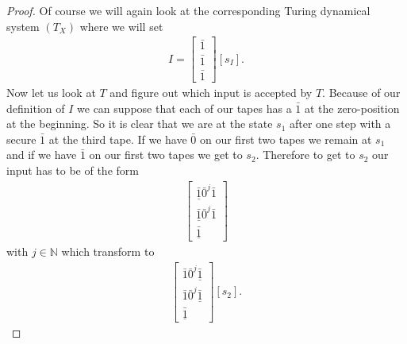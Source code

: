 \documentclass[12pt,a4paper]{scrartcl}
\theoremstyle{plain}
\theoremstyle{definition}
\numberwithin{equation}{section}
\newcommand{\N}{\mathbb{N}} %
\newcommand{\2}{\mathbb{Z} / 2 \mathbb{Z}}
\newcommand{\1}{\bar{1}}
\newcommand{\0}{\bar{0}}
\begin{document}
\begin{proof}
	
	Of course we will again look at the corresponding Turing dynamical system $(T_X)$ where we will set 
	\begin{align*}
		I = \begin{bmatrix}
		\1 \\
		\1 \\
		\1 
		\end{bmatrix}[s_I].
	\end{align*}
	Now let us look at $T$ and figure out which input is accepted by $T$. Because of our definition of $I$ we can suppose that each of our tapes has a $\1$ at the zero-position at the beginning. So it is clear that we are at the state $s_1$ after one step with a secure $\1$ at the third tape. If we have $\0$ on our first two tapes we remain at $s_1$ and if we have $\1$ on our first two tapes we get to $s_2$. Therefore to get to $s_2$ our input has to be of the form 
	\begin{align*}
		\begin{bmatrix}
			\underline{\1} \0^j \1 \\
			\underline{\1} \0^j \1 \\
			\underline{\1} 
		\end{bmatrix}
	\end{align*}
	with $j \in \N$ which transform to
	\begin{align*}
	\begin{bmatrix}
	\1 \0^j \underline{\1}  \\
	\1 \0^j \underline{\1}  \\
	\underline{\1} 
	\end{bmatrix}[s_2].
	\end{align*}


\end{proof}
\end{document}
